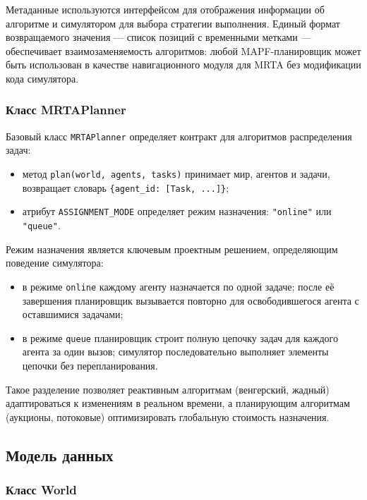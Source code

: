 Метаданные используются интерфейсом для отображения информации об алгоритме и симулятором для выбора стратегии выполнения. Единый формат возвращаемого значения --- список позиций с временными метками --- обеспечивает взаимозаменяемость алгоритмов: любой MAPF-планировщик может быть использован в качестве навигационного модуля для MRTA без модификации кода симулятора.

\subsubsection{Класс MRTAPlanner}

Базовый класс \texttt{MRTAPlanner} определяет контракт для алгоритмов распределения задач:

\begin{itemize}
    \item метод \texttt{plan(world, agents, tasks)} принимает мир, агентов и задачи, возвращает словарь \texttt{\{agent\_id: [Task, ...]\}};
    \item атрибут \texttt{ASSIGNMENT\_MODE} определяет режим назначения: \texttt{"online"} или \texttt{"queue"}.
\end{itemize}

Режим назначения является ключевым проектным решением, определяющим поведение симулятора:

\begin{itemize}
    \item в режиме \texttt{online} каждому агенту назначается по одной задаче; после её завершения планировщик вызывается повторно для освободившегося агента с оставшимися задачами;
    \item в режиме \texttt{queue} планировщик строит полную цепочку задач для каждого агента за один вызов; симулятор последовательно выполняет элементы цепочки без перепланирования.
\end{itemize}

Такое разделение позволяет реактивным алгоритмам (венгерский, жадный) адаптироваться к изменениям в реальном времени, а планирующим алгоритмам (аукционы, потоковые) оптимизировать глобальную стоимость назначения.

\subsection{Модель данных}

\subsubsection{Класс World}

